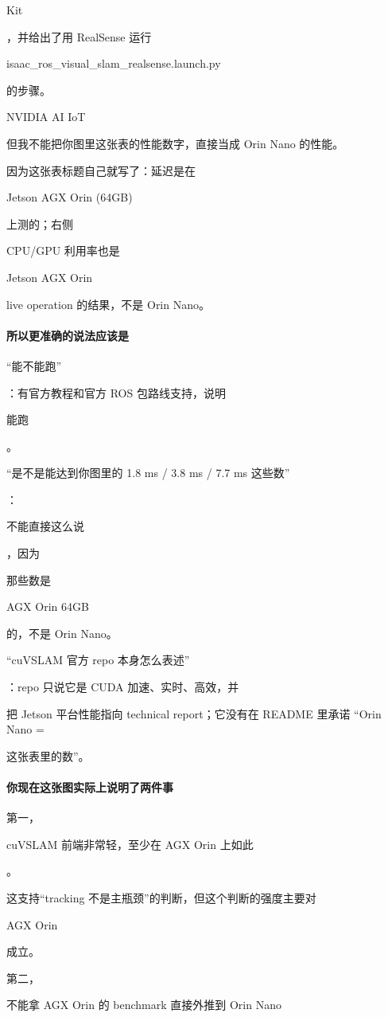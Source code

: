 \documentclass[12pt]{article}
\begin{document}
Kit

，并给出了用 RealSense 运行

isaac\_ros\_visual\_slam\_realsense.launch.py

的步骤。

NVIDIA AI IoT

但我不能把你图里这张表的性能数字，直接当成 Orin Nano 的性能。

因为这张表标题自己就写了：延迟是在

Jetson AGX Orin (64GB)

上测的；右侧

CPU/GPU 利用率也是

Jetson AGX Orin

live operation 的结果，不是 Orin Nano。

\paragraph{所以更准确的说法应该是}
“能不能跑”

：有官方教程和官方 ROS 包路线支持，说明

能跑

。

“是不是能达到你图里的 1.8 ms / 3.8 ms / 7.7 ms 这些数”

：

不能直接这么说

，因为

那些数是

AGX Orin 64GB

的，不是 Orin Nano。

“cuVSLAM 官方 repo 本身怎么表述”

：repo 只说它是 CUDA 加速、实时、高效，并

把 Jetson 平台性能指向 technical report；它没有在 README 里承诺 “Orin Nano =

这张表里的数”。

\paragraph{你现在这张图实际上说明了两件事}
第一，

cuVSLAM 前端非常轻，至少在 AGX Orin 上如此

。

这支持“tracking 不是主瓶颈”的判断，但这个判断的强度主要对

AGX Orin

成立。

第二，

不能拿 AGX Orin 的 benchmark 直接外推到 Orin Nano
\end{document}
